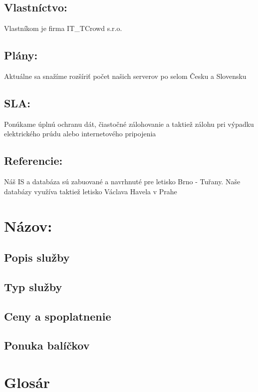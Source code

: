 \documentclass[a4paper, 11pt]{article}
\begin{document}
\subsection*{Vlastníctvo:}
Vlastníkom je firma IT\_TCrowd s.r.o.
\subsection*{Plány:}
Aktuálne sa snažíme rozšíriť počet našich serverov po selom Česku a Slovensku
\subsection*{SLA:}
Ponúkame úplnú ochranu dát, čiastočné zálohovanie a taktiež zálohu pri výpadku elektrického prúdu alebo internetového pripojenia
\subsection*{Referencie:}
Náš IS a databáza sú zabuované a navrhnuté pre letisko Brno - Tuřany. Naše databázy využíva taktiež letisko Václava Havela v Prahe


\section*{Názov:}
\subsection*{Popis služby}
\subsection*{Typ služby}
\subsection*{Ceny a spoplatnenie}
\subsection*{Ponuka balíčkov}



\clearpage
\section*{Glosár}
\end{document}
